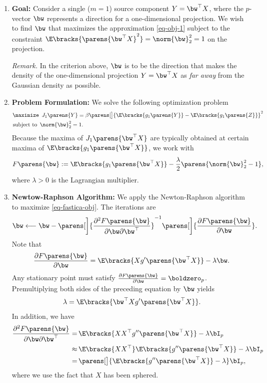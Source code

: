 \documentclass[12pt]{article}
\begin{document}
\begin{enumerate}[label=\textbf{\arabic*.}]

	\item \textbf{Goal:} Consider a single ($m = 1$) source component $Y = \bw^\top X$, where the $p$-vector $\bw$ represents a direction for a one-dimensional projection. We wish to find $\bw$ that maximizes the approximation \eqref{eq-obj-1} subject to the constraint $\E \bracks{ \parens{\bw^\top X}^2 } = \norm{\bw}_2^2 = 1$ on the projection. 
	
	\textit{Remark.} In the criterion above, $\bw$ is to be the direction that makes the density of the one-dimensional projection $Y = \bw^\top X$ as \emph{far away} from the Gaussian density as possible. 
	
	\item \textbf{Problem Formulation:} We solve the following optimization problem 
	\begin{align*}
		\maximize & \, \ J_1 \parens{Y} = \beta \parens[\big]{\E \bracks{g_1 \parens{Y}} - \E \bracks{g_1 \parens{Z}}}^2 \\ 
		\text{subject to } & \, \norm{\bw}_2^2 = 1. 
	\end{align*}
	Because the maxima of $J_1 \parens{\bw^\top X}$ are typically obtained at certain maxima of $\E \bracks{g_1 \parens{\bw^\top X}}$, we work with 
	\begin{align}\label{eq-fastica-obj}
		F \parens{\bw} := \E \bracks{g_1 \parens{\bw^\top X}} - \frac{\lambda}{2} \parens{\norm{\bw}_2^2 - 1}, 
	\end{align}
	where $\lambda > 0$ is the Lagrangian multiplier. 
	
	\item \textbf{Newtow-Raphson Algorithm:} We apply the Newton-Raphson algorithm to maximize \eqref{eq-fastica-obj}. The iterations are 
	\begin{align}
		\bw \longleftarrow \bw - \parens[\bigg]{\frac{\partial^2 F \parens{\bw}}{\partial \bw \partial \bw^\top}}^{-1} \parens[\bigg]{\frac{\partial F \parens{\bw}}{\partial \bw}}. 
	\end{align}
	Note that 
	\begin{align*}
		\frac{\partial F \parens{\bw}}{\partial \bw} = \E \bracks{X g' \parens{\bw^\top X}} - \lambda \bw. 
	\end{align*}
	Any stationary point must satisfy $\frac{\partial F \parens{\bw}}{\partial \bw} = \boldzero_p$. Premultiplying both sides of the preceding equation by $\bw$ yields 
	\begin{align*}
		\lambda = \E \bracks{\bw^\top X g' \parens{\bw^\top X}}. 
	\end{align*}
	In addition, we have 
	\begin{align*}
		\frac{\partial^2 F \parens{\bw}}{\partial \bw \partial \bw^\top} = & \, \E \bracks{X X^\top g'' \parens{\bw^\top X}} - \lambda \bI_p \\ 
		\approx & \, \E \bracks{X X^\top} \E \bracks{ g'' \parens{\bw^\top X}} - \lambda \bI_p \\ 
		= & \, \parens[\big]{\E \bracks{ g'' \parens{\bw^\top X}} - \lambda} \bI_p, 
	\end{align*}
	where we use the fact that $X$ has been sphered. 
	

\end{enumerate}
\end{document}
